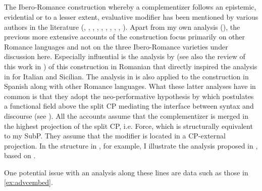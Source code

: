 \subsection{\citet{Cruschina2017a, Cruschina2018}}
The Ibero-Romance construction whereby a complementizer follows an epistemic, evidential or to a lesser extent, evaluative modifier has been mentioned by various authors in the literature (\citealt{MartinZorraquino1998},  \citealt{Etxepare1997},  \citealt{Hummel2000,Hummel2014,Hummel2017}, \citealt{Gutierrez-Rexach2001}, \citealt{FreitesBarros2006}, \citealt{HernanzRigau2006}, \citealt{Ocampo2006}, \citealt{Rodriguez-Ramalle2007,Rodriguez-Ramalle2008,Rodriguez-Ramalle2015}, \citealt{Gras2010}, \citealt{Sansinenaetal2015}). Apart from my own analysis (\citealt{Kocher2014, Kocher2017}), the previous more extensive accounts of the construction focus primarily on other Romance languages  and not on the three Ibero-Romance varieties under discussion  here. Especially influential is the analysis by \citet{Hill2007b} (see also the review of this work in \citealt{Lupsa2011}) of this construction in Romanian that directly inspired the analysis in \citet{Cruschina2013} for Italian and Sicilian. The analysis in \citet{Cruschina2017a, Cruschina2018} is also applied to the  construction in Spanish along with other Romance languages.
What these  latter analyses have in common is that they adopt the neo-performative hypothesis by \citet{SpeasTenny2003} which postulates a functional field above the split CP mediating the interface between syntax and discourse (see ). All the accounts assume that the complementizer is merged in the highest projection of the split CP, i.e. Force, which is structurally equivalent to my SubP. They assume that the modifier is located in a CP-external projection. In the structure in , for example, I illustrate the analysis proposed in \citet{Cruschina2018},  based on \citet{SpeasTenny2003}.
 

One potential issue with an analysis along these lines are data such as those in \eqref{ex:advcembed}.\largerpage

